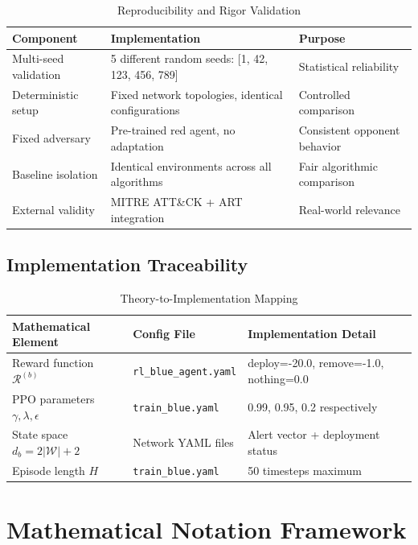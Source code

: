 \documentclass[12pt,oneside]{article}
\begin{document}
\begin{table}[H]
\centering
\caption{Reproducibility and Rigor Validation}
\label{tab:reproducibility}
\small
\begin{tabular}{|p{3cm}|p{5cm}|p{4cm}|}
\hline
\rowcolor{cwBorder!30} \textbf{Component} & \textbf{Implementation} & \textbf{Purpose} \\
\hline
Multi-seed validation & 5 different random seeds: [1, 42, 123, 456, 789] & Statistical reliability \\
\hline
Deterministic setup & Fixed network topologies, identical configurations & Controlled comparison \\
\hline
Fixed adversary & Pre-trained red agent, no adaptation & Consistent opponent behavior \\
\hline
Baseline isolation & Identical environments across all algorithms & Fair algorithmic comparison \\
\hline
External validity & MITRE ATT\&CK + ART integration & Real-world relevance \\
\hline
\end{tabular}
\end{table}

\subsection{Implementation Traceability}

\begin{table}[H]
\centering
\caption{Theory-to-Implementation Mapping}
\label{tab:theory_implementation}
\small
\begin{tabular}{|p{3cm}|p{4cm}|p{5cm}|}
\hline
\rowcolor{cwBorder!30} \textbf{Mathematical Element} & \textbf{Config File} & \textbf{Implementation Detail} \\
\hline
Reward function $\mathcal{R}^{(b)}$ & \texttt{rl\_blue\_agent.yaml} & deploy=-20.0, remove=-1.0, nothing=0.0 \\
\hline
PPO parameters $\gamma, \lambda, \epsilon$ & \texttt{train\_blue.yaml} & 0.99, 0.95, 0.2 respectively \\
\hline
State space $d_b = 2|\mathcal{W}| + 2$ & Network YAML files & Alert vector + deployment status \\
\hline
Episode length $H$ & \texttt{train\_blue.yaml} & 50 timesteps maximum \\
\hline
\end{tabular}
\end{table}

\section{Mathematical Notation Framework}
\end{document}
